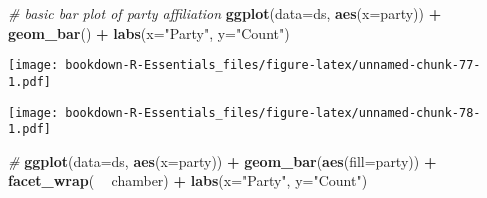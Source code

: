 \documentclass[]{book}
\newenvironment{Shaded}{\begin{snugshade}}{\end{snugshade}}
\newcommand{\KeywordTok}[1]{\textcolor[rgb]{0.13,0.29,0.53}{\textbf{#1}}}
\newcommand{\DataTypeTok}[1]{\textcolor[rgb]{0.13,0.29,0.53}{#1}}
\newcommand{\StringTok}[1]{\textcolor[rgb]{0.31,0.60,0.02}{#1}}
\newcommand{\CommentTok}[1]{\textcolor[rgb]{0.56,0.35,0.01}{\textit{#1}}}
\newcommand{\OperatorTok}[1]{\textcolor[rgb]{0.81,0.36,0.00}{\textbf{#1}}}
\newcommand{\NormalTok}[1]{#1}
\begin{document}
\begin{Shaded}
\begin{Highlighting}[]
\CommentTok{# basic bar plot of party affiliation}
\KeywordTok{ggplot}\NormalTok{(}\DataTypeTok{data=}\NormalTok{ds, }\KeywordTok{aes}\NormalTok{(}\DataTypeTok{x=}\NormalTok{party)) }\OperatorTok{+}\StringTok{ }\KeywordTok{geom_bar}\NormalTok{() }\OperatorTok{+}
\StringTok{  }\KeywordTok{labs}\NormalTok{(}\DataTypeTok{x=}\StringTok{"Party"}\NormalTok{, }\DataTypeTok{y=}\StringTok{"Count"}\NormalTok{)}
\end{Highlighting}
\end{Shaded}

\texttt{[image: bookdown-R-Essentials\_files/figure-latex/unnamed-chunk-77-1.pdf]}

\begin{Shaded}
\end{Shaded}

\texttt{[image: bookdown-R-Essentials\_files/figure-latex/unnamed-chunk-78-1.pdf]}

\begin{Shaded}
\begin{Highlighting}[]
\CommentTok{#}
\KeywordTok{ggplot}\NormalTok{(}\DataTypeTok{data=}\NormalTok{ds, }\KeywordTok{aes}\NormalTok{(}\DataTypeTok{x=}\NormalTok{party)) }\OperatorTok{+}\StringTok{ }
\StringTok{  }\KeywordTok{geom_bar}\NormalTok{(}\KeywordTok{aes}\NormalTok{(}\DataTypeTok{fill=}\NormalTok{party)) }\OperatorTok{+}
\StringTok{  }\KeywordTok{facet_wrap}\NormalTok{( }\OperatorTok{~}\StringTok{ }\NormalTok{chamber) }\OperatorTok{+}
\StringTok{  }\KeywordTok{labs}\NormalTok{(}\DataTypeTok{x=}\StringTok{"Party"}\NormalTok{, }\DataTypeTok{y=}\StringTok{"Count"}\NormalTok{)}
\end{Highlighting}
\end{Shaded}
\end{document}
